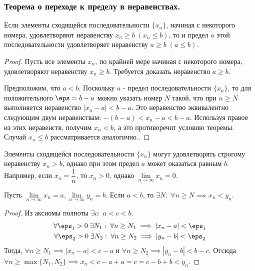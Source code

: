 \documentclass[12pt, a4paper]{article}
\begin{document}
	\subsubsection{Теорема о переходе к пределу в неравенствах.}
	\begin{theorem*}
		Если элементы сходящейся последовательности $\{x_n\}$, начиная с некоторого номера, удовлетворяют неравенству $x_n \geq b \; (x_n \leq b)$, то и предел $a$ этой последовательности удовлетворяет неравенству $a \geq b \; (a \leq b)$.
	\end{theorem*}
	\begin{proof}
		Пусть все элементы $x_n$, по крайней мере начиная с некоторого номера, удовлетворяют неравенству $x_n \geq b$. Требуется доказать неравенство $a \geq b$. 

		Предположим, что $a < b$. Поскольку $a$ - предел последовательности $\{x_n\}$, то для положительного $\eps = b - a$ можно указать номер $N$ такой, что при $n \geq N$ выполняется неравенство $|x_n - a| < b - a$. Это неравенство эквивалентно следующим двум неравенствам: $-(b - a) < x_n - a < b - a$. Используя правое из этих неравенств, получим $x_n < b$, а это противоречит условию теоремы. Случай $x_n \leq b$ рассматривается аналогично..
	\end{proof}

	\begin{remark}
		Элементы сходящейся последовательности $\{x_n\}$ могут удовлетворять строгому неравенству $x_n > b$, однако при этом предел $a$ может оказаться равным $b$. Например, если $x_n = \dfrac{1}{n}$, то $x_n > 0$, однако $\lim\limits_{n \to \infty} x_n = 0$.
	\end{remark}

	\begin{consequence}
		Пусть $\lim\limits_{n \to \infty} x_n = a, \lim\limits_{n \to \infty} y_n = b$. Если $a < b$, то
		$\exists N: \; \forall n \geq N \implies x_n < y_n$.
	\end{consequence}
	\begin{proof}
		Из аксиомы полноты $\exists c: \; a < c < b$. 
		\[\begin{gathered}
			\forall \eps_1 > 0 \; \exists N_1: \; \forall n \geq N_1 \implies |x_n - a| < \eps_1 \\
			\forall \eps_2 > 0 \; \exists N_2: \; \forall n \geq N_2 \implies |y_n - b| < \eps_2 \\
		\end{gathered}\]
		Тогда, $\forall n \geq N_1 \implies |x_n - a| < c - a$ и $\forall n \geq N_2 \implies |y_n - b| < b - c$. Отсюда $\forall n \geq \max \{N_1, N_2\} \implies x_n < c - a + a = c = c - b + b < y_n$.
	\end{proof}
\end{document}
